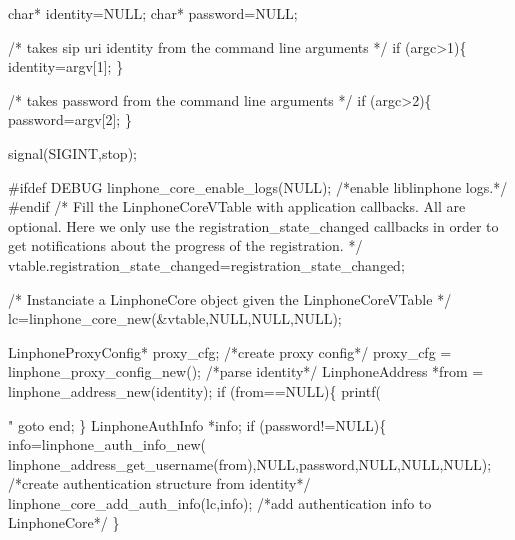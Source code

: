 \begin{DoxyCodeInclude}
{        \textcolor{keywordtype}{char}* identity=NULL;
        \textcolor{keywordtype}{char}* password=NULL;

        \textcolor{comment}{/* takes   sip uri  identity from the command line arguments */}
        \textcolor{keywordflow}{if} (argc>1)\{
                identity=argv[1];
        \}

        \textcolor{comment}{/* takes   password from the command line arguments */}
        \textcolor{keywordflow}{if} (argc>2)\{
                password=argv[2];
        \}

        signal(SIGINT,stop);

\textcolor{preprocessor}{#ifdef DEBUG}
\textcolor{preprocessor}{}        linphone_core_enable_logs(NULL); \textcolor{comment}{/*enable liblinphone logs.*/}
\textcolor{preprocessor}{#endif}
\textcolor{preprocessor}{}        \textcolor{comment}{/* }
\textcolor{comment}{         Fill the LinphoneCoreVTable with application callbacks.}
\textcolor{comment}{         All are optional. Here we only use the registration\_state\_changed callbacks}
\textcolor{comment}{         in order to get notifications about the progress of the registration.}
\textcolor{comment}{         */}
        vtable.registration_state_changed=registration\_state\_changed;

        \textcolor{comment}{/*}
\textcolor{comment}{         Instanciate a LinphoneCore object given the LinphoneCoreVTable}
\textcolor{comment}{        */}
        lc=linphone_core_new(&vtable,NULL,NULL,NULL);

        LinphoneProxyConfig* proxy\_cfg;
        \textcolor{comment}{/*create proxy config*/}
        proxy\_cfg = linphone_proxy_config_new();
        \textcolor{comment}{/*parse identity*/}
        LinphoneAddress *from = linphone_address_new(identity);
        \textcolor{keywordflow}{if} (from==NULL)\{
                printf(\textcolor{stringliteral}{"%
                \textcolor{keywordflow}{goto} end;
        \}
                LinphoneAuthInfo *info;
                \textcolor{keywordflow}{if} (password!=NULL)\{
                        info=linphone_auth_info_new(
      linphone_address_get_username(from),NULL,password,NULL,NULL,NULL); \textcolor{comment}{/*create authentication structure from
       identity*/}
                        linphone_core_add_auth_info(lc,info); \textcolor{comment}{/*add authentication info to LinphoneCore*/}
                \}

}}
\end{DoxyCodeInclude}

